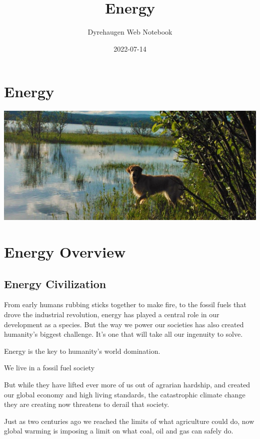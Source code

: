 \documentclass[
]{book}
\title{Energy}
\author{Dyrehaugen Web Notebook}
\date{2022-07-14}
\begin{document}
\maketitle

{
\setcounter{tocdepth}{1}
\tableofcontents
}
\hypertarget{energy}{%
\chapter{Energy}\label{energy}}

\includegraphics{fig/zelda.jpg}

\hypertarget{energy-overview}{%
\chapter{Energy Overview}\label{energy-overview}}

\hypertarget{energy-civilization}{%
\section{Energy Civilization}\label{energy-civilization}}

From early humans rubbing sticks together to make fire, to the fossil fuels that drove the industrial revolution, energy has played a central role in our development as a species. But the way we power our societies has also created humanity's biggest challenge. It's one that will take all our ingenuity to solve.

Energy is the key to humanity's world domination.

We live in a fossil fuel society

But while they have lifted ever more of us out of agrarian hardship, and created our global economy and high living standards, the catastrophic climate change they are creating now threatens to derail that society.

Just as two centuries ago we reached the limits of what agriculture could do, now global warming is imposing a limit on what coal, oil and gas can safely do.
\end{document}
